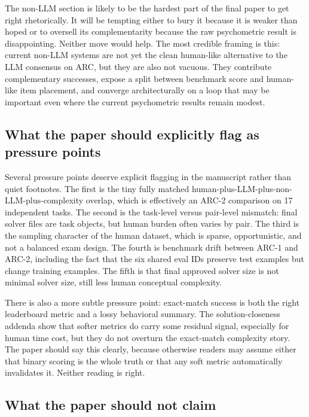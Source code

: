 The non-LLM section is likely to be the hardest part of the final paper to get right rhetorically. It will be tempting either to bury it because it is weaker than hoped or to oversell its complementarity because the raw psychometric result is disappointing. Neither move would help. The most credible framing is this: current non-LLM systems are not yet the clean human-like alternative to the LLM consensus on ARC, but they are also not vacuous. They contribute complementary successes, expose a split between benchmark score and human-like item placement, and converge architecturally on a loop that may be important even where the current psychometric results remain modest.

\subsection{What the paper should explicitly flag as pressure points}

Several pressure points deserve explicit flagging in the manuscript rather than quiet footnotes. The first is the tiny fully matched human-plus-LLM-plus-non-LLM-plus-complexity overlap, which is effectively an ARC-2 comparison on 17 independent tasks. The second is the task-level versus pair-level mismatch: final solver files are task objects, but human burden often varies by pair. The third is the sampling character of the human dataset, which is sparse, opportunistic, and not a balanced exam design. The fourth is benchmark drift between ARC-1 and ARC-2, including the fact that the six shared eval IDs preserve test examples but change training examples. The fifth is that final approved solver size is not minimal solver size, still less human conceptual complexity.

There is also a more subtle pressure point: exact-match success is both the right leaderboard metric and a lossy behavioral summary. The solution-closeness addenda show that softer metrics do carry some residual signal, especially for human time cost, but they do not overturn the exact-match complexity story. The paper should say this clearly, because otherwise readers may assume either that binary scoring is the whole truth or that any soft metric automatically invalidates it. Neither reading is right.

\subsection{What the paper should not claim}

